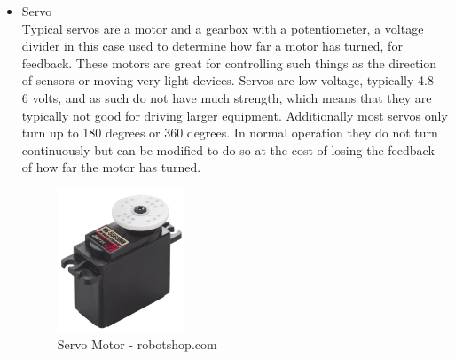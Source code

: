 \begin{itemize}
\item Servo
\\Typical servos are a motor and a gearbox with a potentiometer, a voltage divider in this case used to determine how far a motor has turned, for feedback.  These motors are great for controlling such things as the direction of sensors or moving very light devices.  Servos are low voltage, typically 4.8 - 6 volts, and as such do not have much strength, which means that they are typically not good for driving larger equipment.  Additionally most servos only turn up to 180 degrees or 360 degrees.  In normal operation they do not turn continuously but can be modified to do so at the cost of losing the feedback of how far the motor has turned.
\begin{figure}[H]
\centering
        \includegraphics[width=1.5in] {Images/servo.jpg}
        \caption{Servo Motor - robotshop.com}
        \label{Servo Motor}
\end{figure}


\end{itemize}
